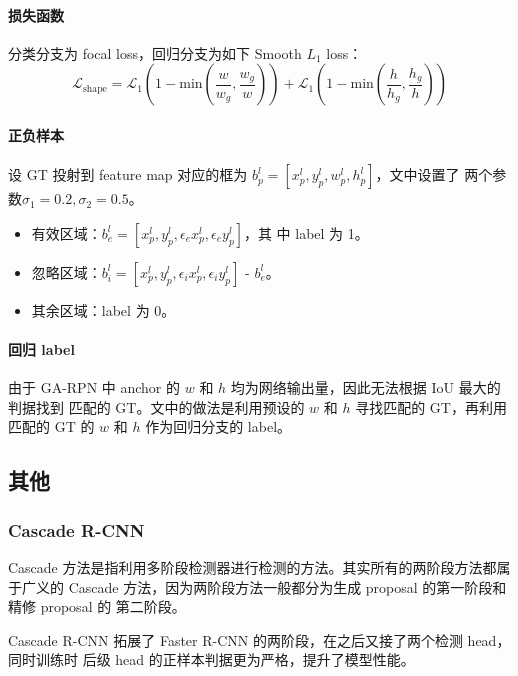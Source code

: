 \paragraph{损失函数}
分类分支为 focal loss，回归分支为如下 Smooth $L_1$ loss：
\begin{equation}
  \mathcal{L}_{\mathrm{shape}} = \mathcal{L}_1 \left( 1 - \mathrm{min}\left( \frac{w}{w_g}, \frac{w_g}{w} \right) \right) + \mathcal{L}_1 \left( 1 - \mathrm{min} \left( \frac{h}{h_g}, \frac{h_g}{h} \right) \right)
\end{equation}

\paragraph{正负样本}
设 GT 投射到 feature map 对应的框为 $b_p^l =[x_p^l, y_p^l, w_p^l, h_p^l]$，文中设置了
两个参数$\sigma_1 = 0.2, \sigma_2 = 0.5$。

\begin{itemize}
  \item 有效区域：$b_e^l=[x_p^l, y_p^l, \epsilon_e x_p^l, \epsilon_e y_p^l]$，其
    中 label 为 1。
  \item 忽略区域：$b_i^l=[x_p^l, y_p^l, \epsilon_i x_p^l, \epsilon_i y_p^l]$ -
    $b_e^l$。
  \item 其余区域：label 为 0。
\end{itemize}

\paragraph{回归 label}
由于 GA-RPN 中 anchor 的 $w$ 和 $h$ 均为网络输出量，因此无法根据 IoU 最大的判据找到
匹配的 GT。文中的做法是利用预设的 $w$ 和 $h$ 寻找匹配的 GT，再利用匹配的 GT 的 $w$ 和
$h$ 作为回归分支的 label。

\subsection{其他}

\subsubsection{Cascade R-CNN}
\label{subsub:cascade-rcnn}

Cascade 方法是指利用多阶段检测器进行检测的方法。其实所有的两阶段方法都属于广义的
Cascade 方法，因为两阶段方法一般都分为生成 proposal 的第一阶段和精修 proposal 的
第二阶段。

Cascade R-CNN 拓展了 Faster R-CNN 的两阶段，在之后又接了两个检测 head，同时训练时
后级 head 的正样本判据更为严格，提升了模型性能。

